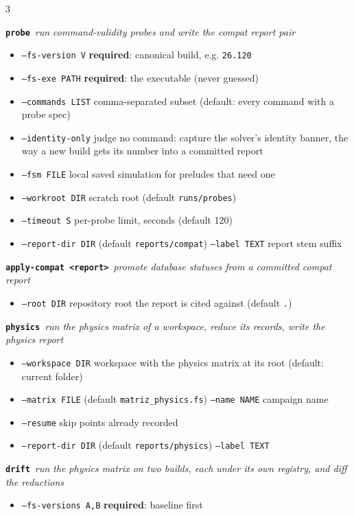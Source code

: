 \documentclass[a4paper,landscape]{article}
\newcommand{\fl}[1]{\textcolor{flag}{\texttt{#1}}}
\newcommand{\cmd}[1]{\textcolor{acc}{\textbf{\texttt{#1}}}}
\newenvironment{flags}{\begin{itemize}[leftmargin=2.2mm,itemsep=-0.4pt,topsep=0pt,parsep=0pt,label={\tiny$\bullet$}]}{\end{itemize}}
\newcommand{\sub}[2]{\vspace{1.4pt}\cmd{#1}\ {\itshape #2}\par}
\newcommand{\tool}[2]{\vspace{2pt}{\color{white}\colorbox{tool}{\parbox{\dimexpr\linewidth-2\fboxsep}{\raggedright\bfseries\small\texttt{#1}}}}\par\vspace{0.6pt}{\itshape #2}\par}
\begin{document}
\begin{multicols}{3}
\columnbreak
\tool{pyfs-qa}{evidence tooling of the command database: probes run the solver locally on a licensed machine}
\sub{probe}{run command-validity probes and write the compat report pair}
\begin{flags}
\item \fl{--fs-version V} \textbf{required}: canonical build, e.g. \texttt{26.120}
\item \fl{--fs-exe PATH} \textbf{required}: the executable (never guessed)
\item \fl{--commands LIST} comma-separated subset (default: every command with a probe spec)
\item \fl{--identity-only} judge no command: capture the solver's identity banner, the way a new build gets its number into a committed report
\item \fl{--fsm FILE} local saved simulation for preludes that need one
\item \fl{--workroot DIR} scratch root (default \texttt{runs/probes})
\item \fl{--timeout S} per-probe limit, seconds (default 120)
\item \fl{--report-dir DIR} (default \texttt{reports/compat}) \quad \fl{--label TEXT} report stem suffix
\end{flags}
\sub{apply-compat <report>}{promote database statuses from a committed compat report}
\begin{flags}
\item \fl{--root DIR} repository root the report is cited against (default \texttt{.})
\end{flags}
\sub{physics}{run the physics matrix of a workspace, reduce its records, write the physics report}
\begin{flags}
\item \fl{--workspace DIR} workspace with the physics matrix at its root (default: current folder)
\item \fl{--matrix FILE} (default \texttt{matriz\_physics.fs}) \quad \fl{--name NAME} campaign name
\item \fl{--resume} skip points already recorded
\item \fl{--report-dir DIR} (default \texttt{reports/physics}) \quad \fl{--label TEXT}
\end{flags}
\sub{drift}{run the physics matrix on two builds, each under its own registry, and diff the reductions}
\begin{flags}
\item \fl{--fs-versions A,B} \textbf{required}: baseline first

\end{flags}
\end{multicols}
\end{document}
